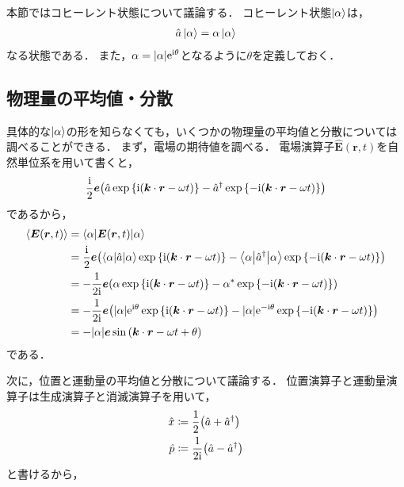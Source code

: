 \documentclass{report}
\begin{document}
  本節ではコヒーレント状態について議論する．
  コヒーレント状態$\ket{\alpha}$は，
  \begin{align}
    \hat{a}\ket{\alpha} = \alpha\ket{\alpha}\label{coherent-def}
  \end{align}
  なる状態である．
  また，$\alpha = \abs{\alpha}\mathrm{e}^{\mathrm{i}\theta}$となるように$\theta$を定義しておく．
  \subsection{物理量の平均値・分散}
    具体的な$\ket{\alpha}$の形を知らなくても，いくつかの物理量の平均値と分散については調べることができる．
    まず，電場の期待値を調べる．
    電場演算子$\hat{\bm{E}}(\bm{r}, t)$を自然単位系を用いて書くと，
    \begin{align}
      \frac{\mathrm{i}}{2}\bm{e}\qty(\hat{a}\exp\qty{\mathrm{i}(\bm{k}\cdot\bm{r} - \omega t)} - \hat{a}^{\dag}\exp\qty{-\mathrm{i}(\bm{k}\cdot\bm{r} - \omega t)})
    \end{align}
    であるから，
    \begin{align}
      \ev{\bm{E}(\bm{r}, t)} &= \mel**{\alpha}{\bm{E}(\bm{r}, t)}{\alpha} \\ 
      &= \frac{\i}{2}\bm{e}\qty(\mel**{\alpha}{\hat{a}}{\alpha}\exp\qty{\i(\bm{k}\cdot\bm{r} - \omega t)} - \mel**{\alpha}{\hat{a}^{\dag}}{\alpha}\exp\qty{-\i(\bm{k}\cdot\bm{r} - \omega t)}) \\ 
      &= -\frac{1}{2\i}\bm{e}\qty(\alpha\exp\qty{\i(\bm{k}\cdot\bm{r} - \omega t)} - \alpha^*\exp\qty{-\i(\bm{k}\cdot\bm{r} - \omega t)}) \\ 
      &= -\frac{1}{2\i}\bm{e}\qty(\abs{\alpha}\e^{\i\theta}\exp\qty{\i(\bm{k}\cdot\bm{r} - \omega t)} - \abs{\alpha}\e^{-\i\theta}\exp\qty{-\i(\bm{k}\cdot\bm{r} - \omega t)}) \\ 
      &= -\abs{\alpha}\bm{e}\sin\qty(\bm{k}\cdot\bm{r} - \omega t + \theta)
    \end{align}
    である．
    \par
    次に，位置と運動量の平均値と分散について議論する．
    位置演算子と運動量演算子は生成演算子と消滅演算子を用いて，
    \begin{align}
      \hat{x} &\coloneqq \frac{1}{2}\qty(\hat{a} + \hat{a}^{\dag}) \\ 
      \hat{p} &\coloneqq \frac{1}{2\mathrm{i}}\qty(\hat{a} - \hat{a}^{\dag})
    \end{align}
    と書けるから，
\end{document}
